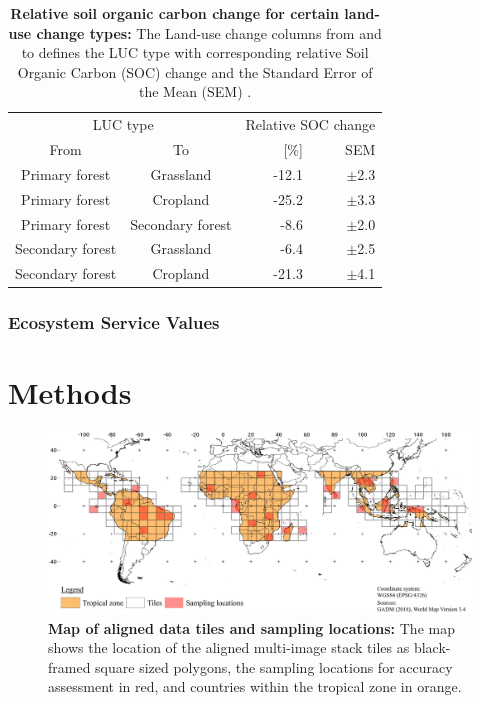 			\begin{table}[ht]
				\centering
				\caption[Relative soil organic carbon change for certain land-use change types]{\textbf{Relative soil organic carbon change for certain land-use change types:} The Land-use change columns from and to defines the LUC type with corresponding relative Soil Organic Carbon (SOC) change and the Standard Error of the Mean (SEM) \citep{Don2010}.}
				\label{tab:soc}
				\begin{tabular}{ccrr}
					\hline
					\multicolumn{2}{c}{LUC type} & \multicolumn{2}{c}{Relative SOC change} \\
					From & To & [\%] & SEM \\\hline
					Primary forest & Grassland & -12.1 & $\pm$2.3 \\
					Primary forest & Cropland & -25.2 & $\pm$3.3 \\
					Primary forest & Secondary forest & -8.6 & $\pm$2.0 \\
					Secondary forest & Grassland & -6.4 & $\pm$2.5 \\
					Secondary forest & Cropland & -21.3 & $\pm$4.1 \\\hline
				\end{tabular}
			\end{table}

		\subsubsection{Ecosystem Service Values}


\section{Methods}
\label{sec:methods}
	\begin{figure}[ht]
		\centering
		\includegraphics[scale=.97]{img/method_overview_frameless}
		\caption[Map of aligned data tiles and sampling locations]{\textbf{Map of aligned data tiles and sampling locations:} The map shows the location of the aligned multi-image stack tiles as black-framed square sized polygons, the sampling locations for accuracy assessment in red, and countries within the tropical zone in orange.}
		\label{fig:processing}
	\end{figure}

